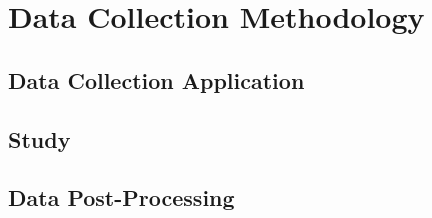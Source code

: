 \section{Data Collection Methodology} %

\subsection{Data Collection Application}

\subsection{Study}

\subsection{Data Post-Processing}

